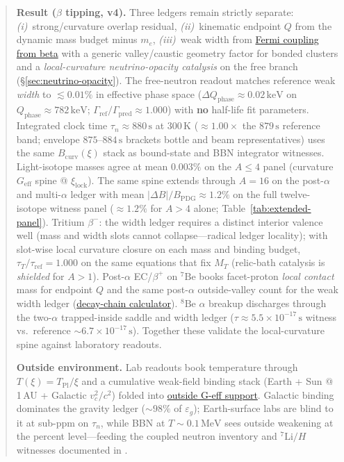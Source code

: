 \documentclass[11pt,notitlepage]{amsart}
\begin{document}
\begin{abstract}
\noindent\textbf{Result ($\beta$ tipping, v4).}
Three ledgers remain strictly separate:
\emph{(i)}~strong/curvature overlap residual,
\emph{(ii)}~kinematic endpoint $Q$ from the dynamic mass budget minus $m_e$,
\emph{(iii)}~weak width from \hyperref[lean:gf-from-beta]{Fermi coupling from beta}
with a generic valley/caustic geometry factor for bonded clusters and a
\emph{local-curvature neutrino-opacity catalysis} on the free branch
(\S\ref{sec:neutrino-opacity}).
The free-neutron readout matches reference weak \emph{width} to
$\lesssim 0.01\%$ in effective phase space
($\Delta Q_{\mathrm{phase}}\approx 0.02\,\mathrm{keV}$ on $Q_{\mathrm{phase}}\approx 782\,\mathrm{keV}$;
$\Gamma_{\mathrm{ref}}/\Gamma_{\mathrm{pred}}\approx 1.000$) with \textbf{no} half-life fit
parameters. Integrated clock time $\tau_n\approx 880\,\mathrm{s}$ at $300\,\mathrm{K}$
($\approx 1.00\times$ the $879\,\mathrm{s}$ reference band; envelope
$875$--$884\,\mathrm{s}$ brackets bottle and beam representatives) uses the same
$B_{\mathrm{curv}}(\xi)$ stack as bound-state and BBN integrator witnesses.
Light-isotope masses agree at mean $0.003\%$ on the $A\le 4$ panel (curvature
$G_{\mathrm{eff}}$ spine @ $\xi_{\mathrm{lock}}$). The same spine extends through
$A=16$ on the post-$\alpha$ and multi-$\alpha$ ledger with mean
$|\Delta B|/B_{\mathrm{PDG}}\approx 1.2\%$ on the full twelve-isotope witness panel
($\approx 1.2\%$ for $A>4$ alone; Table~\ref{tab:extended-panel}).
Tritium $\beta^-$:
the width ledger requires a distinct interior valence well (mass and width slots
cannot collapse---radical ledger locality); with slot-wise local curvature closure on
each mass and binding budget,
$\tau_T/\tau_{\mathrm{ref}}=1.000$ on the same equations that fix $M_T$
(relic-bath catalysis is \emph{shielded} for $A>1$). Post-$\alpha$ EC/$\beta^+$ on
$^7\mathrm{Be}$ books facet-proton \emph{local contact} mass for endpoint $Q$ and the
same post-$\alpha$ outside-valley count for the weak width ledger
(\hyperref[script:decay-chain]{decay-chain calculator}).
$^8\mathrm{Be}$ $\alpha$ breakup discharges through the two-$\alpha$
trapped-inside saddle and width ledger ($\tau\approx 5.5\times 10^{-17}\,\mathrm{s}$
witness vs.\ reference $\sim 6.7\times 10^{-17}\,\mathrm{s}$).
Together these validate the local-curvature spine against laboratory readouts.

\noindent\textbf{Outside environment.}
Lab readouts book temperature through $T(\xi)=T_{\mathrm{Pl}}/\xi$ and a cumulative
weak-field binding stack (Earth + Sun @ 1\,AU + Galactic $v_c^2/c^2$) folded into
\hyperref[lean:geff-outside]{outside G-eff support}. Galactic binding
dominates the gravity ledger ($\sim 98\%$ of $\varepsilon_g$); Earth-surface labs
are blind to it at sub-ppm on $\tau_n$, while BBN at $T\sim 0.1\,\mathrm{MeV}$ sees
outside weakening at the percent level---feeding the coupled neutron inventory and
$^7\mathrm{Li}/H$ witnesses documented in \cite{hqiv-bbn-paper}.


\end{abstract}
\end{document}
